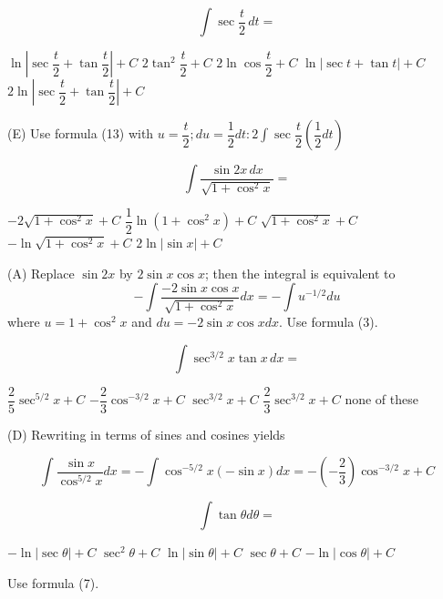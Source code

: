 \question
\[
\displaystyle\int \sec \dfrac{t}{2} \,dt=
\]
\begin{choices}
  \choice $\ln \left|\sec \dfrac{t}{2}+\tan \dfrac{t}{2}\right|+C$
  \choice $2 \tan ^{2} \dfrac{t}{2}+C$
  \choice $2 \ln \cos \dfrac{t}{2}+C$
  \choice $\ln |\sec t+\tan t|+C$
  \CorrectChoice $2 \ln \left|\sec \dfrac{t}{2}+\tan \dfrac{t}{2}\right|+C$
\end{choices}
\begin{solution}
(E) Use formula (13) with $u=\dfrac{t}{2} ; d u=\dfrac{1}{2} d t: 2 \displaystyle\int \sec \dfrac{t}{2}\left(\dfrac{1}{2} d t\right)$
\end{solution}

\question
\[
\displaystyle\int \dfrac{\sin 2 x \,dx}{\sqrt{1+\cos ^{2} x}}=
\]
\begin{choices}
  \CorrectChoice $-2 \sqrt{1+\cos ^{2} x}+C$
  \choice $\dfrac{1}{2} \ln \left(1+\cos ^{2} x\right)+C$
  \choice $\sqrt{1+\cos ^{2} x}+C$
  \choice $-\ln \sqrt{1+\cos ^{2} x}+C$
  \choice $2 \ln |\sin x|+C$
\end{choices}
\begin{solution}
(A) Replace $\sin 2 x$ by $2 \sin x \cos x$; then the integral is equivalent to
\[
-\displaystyle\int \dfrac{-2 \sin x \cos x}{\sqrt{1+\cos ^{2} x}} d x=-\displaystyle\int u^{-1 / 2} d u
\]
where $u=1+\cos ^{2} x$ and $d u=-2 \sin x \cos x d x$. Use formula (3).
\end{solution}




\newpage


\question
\[
\displaystyle\int \sec ^{3 / 2} x \tan x \,dx=
\]
\begin{choices}
  \choice $\dfrac{2}{5} \sec ^{5 / 2} x+C$
  \choice $-\dfrac{2}{3} \cos ^{-3 / 2} x+C$
  \choice $\sec ^{3 / 2} x+C$
  \CorrectChoice $\dfrac{2}{3} \sec ^{3 / 2} x+C$
  \choice none of these
\end{choices}
\begin{solution}
(D) Rewriting in terms of sines and cosines yields

\[
\displaystyle\int \dfrac{\sin x}{\cos ^{5 / 2} x} d x=-\displaystyle\int \cos ^{-5 / 2} x(-\sin x) d x=-\left(-\dfrac{2}{3}\right) \cos ^{-3 / 2} x+C
\]
\end{solution}

\question
\[
\displaystyle\int \tan \theta d \theta=
\]
\begin{choices}
  \choice $-\ln |\sec \theta|+C$
  \choice $\sec ^{2} \theta+C$
  \choice $\ln |\sin \theta|+C$
  \choice $\sec \theta+C$
  \CorrectChoice $-\ln |\cos \theta|+C$
\end{choices}
\begin{solution}
Use formula (7).
\end{solution}

